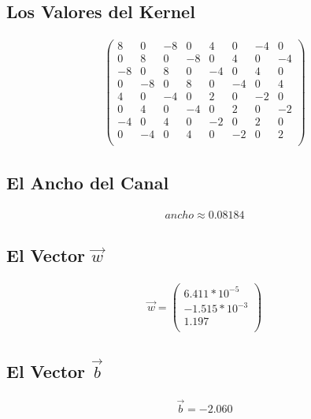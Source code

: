 \documentclass[fleqn]{llncs}
\begin{document}
\subsection{Los Valores del Kernel}
\begin{align*}
	\begin{pmatrix}
		8 & 0 & -8 & 0 & 4 & 0 & -4 & 0 \\
		0 & 8 & 0 & -8 & 0 & 4 & 0 & -4 \\
		-8 & 0 & 8 & 0 & -4 & 0 & 4 & 0 \\
		0 & -8 & 0 & 8 & 0 & -4 & 0 & 4 \\
		4 & 0 & -4 & 0 & 2 & 0 & -2 & 0 \\
		0 & 4 & 0 & -4 & 0 & 2 & 0 & -2 \\
		-4 & 0 & 4 & 0 & -2 & 0 & 2 & 0 \\
		0 & -4 & 0 & 4 & 0 & -2 & 0 & 2 \\
	\end{pmatrix}
\end{align*}

\subsection{El Ancho del Canal}
\begin{align*}
	ancho \approx 0.08184
\end{align*}

\subsection{El Vector $\overrightarrow{w}$}
\begin{align*}
	\overrightarrow{w} =
	\begin{pmatrix}
		6.411*10^{-5} \\
		-1.515*10^{-3} \\
		1.197 \\
	\end{pmatrix}
\end{align*}

\subsection{El Vector $\overrightarrow{b}$}
\begin{align*}
	\overrightarrow{b} = -2.060
\end{align*}
\end{document}
